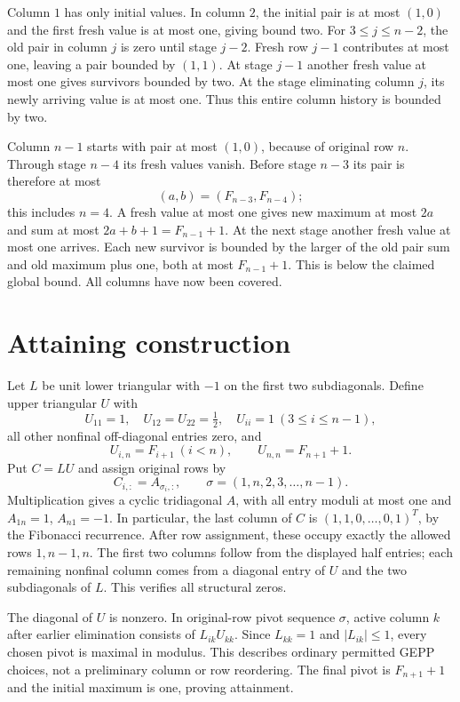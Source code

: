 \documentclass[11pt]{article}
\begin{document}
Column $1$ has only initial values. In column $2$, the initial pair is at most $(1,0)$ and the first fresh value is at most one, giving bound two. For $3\le j\le n-2$, the old pair in column $j$ is zero until stage $j-2$. Fresh row $j-1$ contributes at most one, leaving a pair bounded by $(1,1)$. At stage $j-1$ another fresh value at most one gives survivors bounded by two. At the stage eliminating column $j$, its newly arriving value is at most one. Thus this entire column history is bounded by two.

Column $n-1$ starts with pair at most $(1,0)$, because of original row $n$. Through stage $n-4$ its fresh values vanish. Before stage $n-3$ its pair is therefore at most
\[(a,b)=(F_{n-3},F_{n-4});\]
this includes $n=4$. A fresh value at most one gives new maximum at most $2a$ and sum at most $2a+b+1=F_{n-1}+1$. At the next stage another fresh value at most one arrives. Each new survivor is bounded by the larger of the old pair sum and old maximum plus one, both at most $F_{n-1}+1$. This is below the claimed global bound. All columns have now been covered.
\section{Attaining construction}
Let $L$ be unit lower triangular with $-1$ on the first two subdiagonals. Define upper triangular $U$ with
\[
U_{11}=1,\quad U_{12}=U_{22}=\tfrac12,\quad U_{ii}=1\ (3\le i\le n-1),
\]
all other nonfinal off-diagonal entries zero, and
\[U_{i,n}=F_{i+1}\ (i<n),\qquad U_{n,n}=F_{n+1}+1.\]
Put $C=LU$ and assign original rows by
\[C_{i,:}=A_{\sigma_i,:},\qquad\sigma=(1,n,2,3,\ldots,n-1).\]
Multiplication gives a cyclic tridiagonal $A$, with all entry moduli at most one and $A_{1n}=1$, $A_{n1}=-1$. In particular, the last column of $C$ is $(1,1,0,\ldots,0,1)^T$, by the Fibonacci recurrence. After row assignment, these occupy exactly the allowed rows $1,n-1,n$. The first two columns follow from the displayed half entries; each remaining nonfinal column comes from a diagonal entry of $U$ and the two subdiagonals of $L$. This verifies all structural zeros.

The diagonal of $U$ is nonzero. In original-row pivot sequence $\sigma$, active column $k$ after earlier elimination consists of $L_{ik}U_{kk}$. Since $L_{kk}=1$ and $|L_{ik}|\le1$, every chosen pivot is maximal in modulus. This describes ordinary permitted GEPP choices, not a preliminary column or row reordering. The final pivot is $F_{n+1}+1$ and the initial maximum is one, proving attainment.
\end{document}
